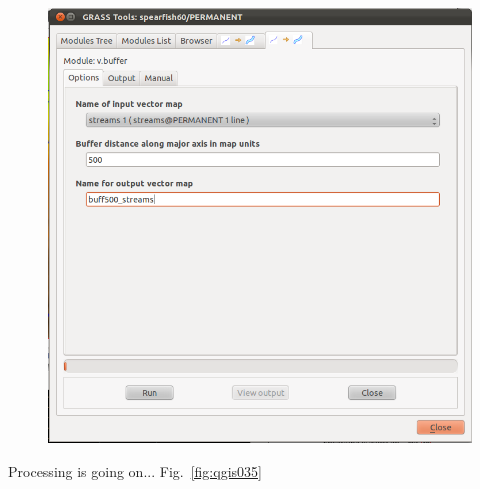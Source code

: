 \begin{figure}[htbp]
   \centering
   \includegraphics[scale=0.3]{qgis034.png}
   \caption{}
   \label{fig:qgis034}
\end{figure}

Processing is going on... Fig.~\ref{fig:qgis035}

